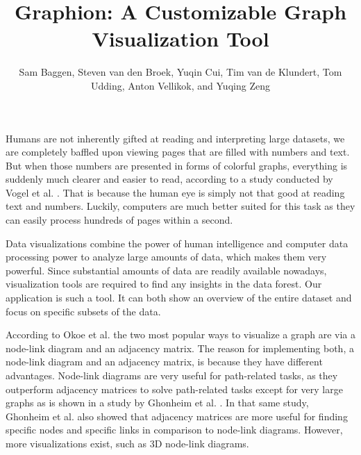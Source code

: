 \documentclass[journal]{vgtc}                %
\title{Graphion: A Customizable Graph Visualization Tool}
\author{Sam Baggen, Steven van den Broek, Yuqin Cui, Tim van de Klundert, Tom Udding, Anton Vellikok, and Yuqing Zeng}
\begin{document}


\maketitle

Humans are not inherently gifted at reading and interpreting large datasets, we are completely baffled upon viewing pages that are filled with numbers and text. But when those numbers are presented in forms of colorful graphs, everything is suddenly much clearer and easier to read, according to a study conducted by Vogel et al. \cite{Vogel:1986}. That is because the human eye is simply not that good at reading text and numbers. Luckily, computers are much better suited for this task as they can easily process hundreds of pages within a second.

Data visualizations combine the power of human intelligence and computer data processing power to analyze large amounts of data, which makes them very powerful. Since substantial amounts of data are readily available nowadays, visualization tools are required to find any insights in the data forest.
Our application is such a tool. It can both show an overview of the entire dataset and focus on specific subsets of the data.

According to Okoe et al. \cite{Okoe:2018} the two most popular ways to visualize a graph are via a node-link diagram and an adjacency matrix. The reason for implementing both, a node-link diagram and an adjacency matrix, is because they have different advantages. Node-link diagrams are very useful for path-related tasks, as they outperform adjacency matrices to solve path-related tasks except for very large graphs as is shown in a study by Ghonheim et al. \cite{Ghonheim:2004}. In that same study, Ghonheim et al. also showed that adjacency matrices are more useful for finding specific nodes and specific links in comparison to node-link diagrams. However, more visualizations exist, such as 3D node-link diagrams.
\end{document}
